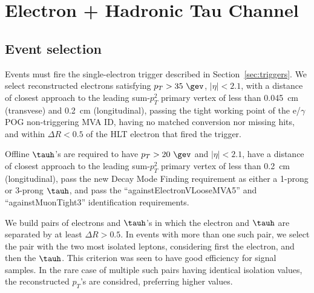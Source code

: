 \section{Electron + Hadronic Tau Channel}\label{sec:eTauhad}


\subsection{Event selection}\label{sec:et_selection}

Events must fire the single-electron trigger described in
Section~\ref{sec:triggers}.  We select reconstructed electrons
satisfying $p_T>35~\gev$, $\vert\eta\vert<2.1$, with a distance of
closest approach to the leading sum-$p_T^2$ primary vertex of less
than 0.045~cm (transvese) and 0.2~cm (longitudinal), passing the tight
working point of the e/$\gamma$ POG non-triggering MVA ID, having no
matched conversion nor missing hits, and within $\Delta R<0.5$ of the
HLT electron that fired the trigger.

Offline $\tauh$'s are required to have $p_{T}> 20~\gev$ and $\vert
\eta \vert < 2.1$, have a distance of closest approach to the leading
sum-$p_T^2$ primary vertex of less than 0.2~cm (longitudinal), pass
the new Decay Mode Finding requirement as either a 1-prong or 3-prong
$\tauh$, and pass the ``againstElectronVLooseMVA5'' and
``againstMuonTight3'' identification requirements.

We build pairs of electrons and $\tauh$'s in which the electron and
$\tauh$ are separated by at least $\Delta R > 0.5$.  In events with
more than one such pair, we select the pair with the two most isolated
leptons, considering first the electron, and then the $\tauh$.  This
criterion was seen to have good efficiency for signal samples.  In the
rare case of multiple such pairs having identical isolation values,
the reconstructed $p_T$'s are considred, preferring higher values.


